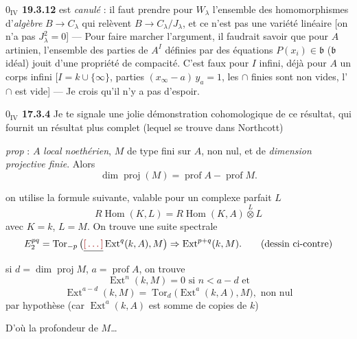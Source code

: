 \documentclass[11pt,a4paper]{article}
\begin{document}
\textbf{$0_{\mathrm{IV}}$ 19.3.12} \quad est \emph{canulé} : il faut prendre
pour $W_\lambda$ l'ensemble des homomorphismes d'\emph{algèbre}
$B \to C_\lambda$ qui relèvent $B \to C_\lambda / J_\lambda$, et ce n'est pas
une variété linéaire [on n'a pas $J_\lambda^2 = 0$] --- Pour faire marcher
l'argument, il faudrait savoir que pour $A$ artinien, l'ensemble des parties
de $A^I$ définies par \struck{\ill{}} des équations $P(x_i) \in \mathfrak{b}$
($\mathfrak{b}$ idéal) jouit d'une propriété de compacité. C'est faux pour
$I$ infini, déjà pour $A$ un corps infini [$I = k \cup \{\infty\}$, parties
$(x_\infty - a)\, y_a = 1$, les $\cap$ finies sont non vides, l'$\cap$ est
vide] --- Je crois qu'il n'y a pas d'espoir.

\textbf{$0_{\mathrm{IV}}$ 17.3.4} \quad Je te signale une jolie démonstration
cohomologique de ce résultat, qui fournit un résultat plus complet (lequel se
trouve dans Northcott)


\emph{prop} : $A$ \emph{local noethérien}, $M$ de type fini sur $A$, non
nul, et de \emph{dimension projective finie}. Alors
\[
  \dim\operatorname{proj}(M) = \operatorname{prof} A - \operatorname{prof} M .
\]

on utilise la formule suivante, valable pour un complexe parfait $L$
\[
  R\operatorname{Hom}(K, L) = R\operatorname{Hom}(K, A) \overset{L}{\otimes} L
\]
avec $K = k$, $L = M$. On trouve une suite spectrale
\[
  E_2^{pq} = \operatorname{Tor}_{-p}\big(\struck{\ill{}}\operatorname{Ext}^q(k, A), M\big)
  \Rightarrow \operatorname{Ext}^{p+q}(k, M) . \qquad \text{(dessin ci-contre)}
\]
si $d = \dim\operatorname{proj} M$, $a = \operatorname{prof} A$, on trouve
\[
  \operatorname{Ext}^n(k, M) = 0 \text{ si } n < a - d \text{ et}
\]
\[
  \operatorname{Ext}^{a-d}(k, M) = \operatorname{Tor}_d\big(\operatorname{Ext}^a(k, A), M\big),
  \text{ non nul}
\]
par hypothèse (car $\operatorname{Ext}^a(k, A)$ est somme de copies de $k$)

D'où la profondeur de $M$\ldots
{}
\end{document}
